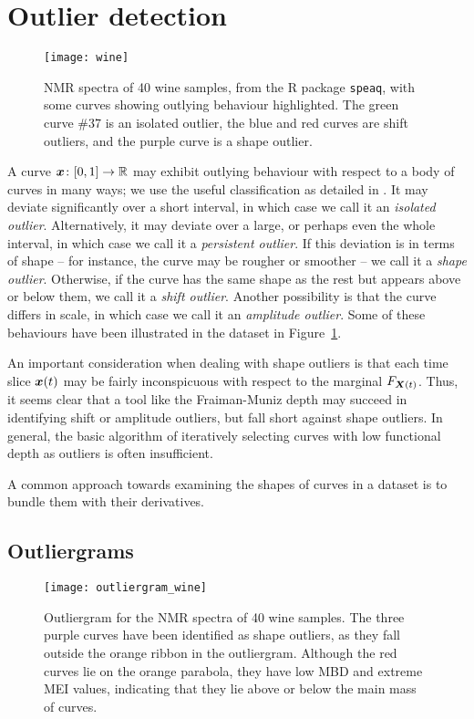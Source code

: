 \section{Outlier detection}

\begin{figure}
    \centering
    \texttt{[image: wine]}
    \caption{
        NMR spectra of 40 wine samples, from the R package \texttt{speaq},
        with some curves showing outlying behaviour highlighted.
        The green curve \#37 is an isolated outlier, the blue and red curves
        are shift outliers, and the purple curve is a shape outlier.
    }
    \label{fig:wine}
\end{figure}

A curve $\bm{x}\colon [0, 1] \to \mathbb{R}$ may exhibit outlying behaviour with respect
to a body of curves in many ways; we use the useful classification as detailed
in \textcite{hubert-rousseeuw-segeart-2015}.
It may deviate significantly over a short interval, in which case we call it
an \emph{isolated outlier}.
Alternatively, it may deviate over a large, or perhaps even the whole
interval, in which case we call it a \emph{persistent outlier}.
If this deviation is in terms of shape -- for instance, the curve may be
rougher or smoother -- we call it a \emph{shape outlier}.
Otherwise, if the curve has the same shape as the rest but appears above or
below them, we call it a \emph{shift outlier}.
Another possibility is that the curve differs in scale, in which case we call
it an \emph{amplitude outlier}.
Some of these behaviours have been illustrated in the dataset in
Figure~\ref{fig:wine}.

An important consideration when dealing with shape outliers is that each time
slice $\bm{x}(t)$ may be fairly inconspicuous with respect to the marginal
$F_{\bm{X}(t)}$.
Thus, it seems clear that a tool like the Fraiman-Muniz depth may succeed in
identifying shift or amplitude outliers, but fall short against shape
outliers.
In general, the basic algorithm of iteratively selecting curves with low
functional depth as outliers is often insufficient.

A common approach towards examining the shapes of curves in a dataset is to
bundle them with their derivatives.


\subsection{Outliergrams}

\begin{figure}
    \centering
    \texttt{[image: outliergram\_wine]}
    \caption{
        Outliergram for the NMR spectra of 40 wine samples.
        The three purple curves have been identified as shape outliers, as
        they fall outside the orange ribbon in the outliergram.
        Although the red curves lie on the orange parabola, they have low MBD
        and extreme MEI values, indicating that they lie above or below the
        main mass of curves.
    }
    \label{fig:outliergram_wine}
\end{figure}



